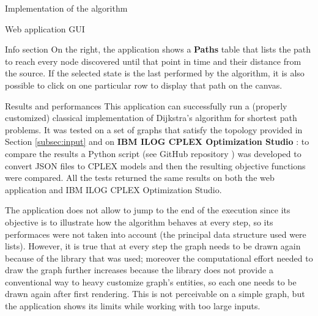 \documentclass[9pt]{extarticle}
\begin{document}
\begin{section}{Implementation of the algorithm}
\begin{subsection}{Web application GUI}
\begin{subsubsection}{Info section}
                On the right, the application shows a \textbf{Paths} table that lists the path to reach every node discovered until that point in time and their
                distance from the source. 
                If the selected state is the last performed by the algorithm, it is also possible to click on one particular row to display that path on the canvas.
            \end{subsubsection}
        \end{subsection}
    \end{section}

    \begin{section}{Results and performances}
        This application can successfully run a (properly customized) classical implementation of Dijkstra's algorithm for shortest path problems. 
        It was tested on a set of graphs that satisfy the topology provided in Section \ref{subsec:input} and on \textbf{IBM ILOG CPLEX Optimization Studio}
        \cite{web:cplex}: to compare the results a Python script (see GitHub repository \cite{github:project}) was developed to convert JSON files to CPLEX 
        models and then the resulting objective functions were compared. 
        All the tests returned the same results on both the web application and IBM ILOG CPLEX Optimization Studio.

        The application does not allow to jump to the end of the execution since its objective is to illustrate how the algorithm behaves at every step, so its 
        performaces were not taken into account (the principal data structure used were lists). 
        However, it is true that at every step the graph needs to be drawn again because of the library\cite{github:digraph} that was used; moreover the 
        computational effort needed to draw the graph further increases because the library does not provide a conventional way to heavy customize graph's entities, 
        so each one needs to be drawn again after first rendering.
        This is not perceivable on a simple graph, but the application shows its limits while working with too large inputs.
    \end{section}
\end{document}
